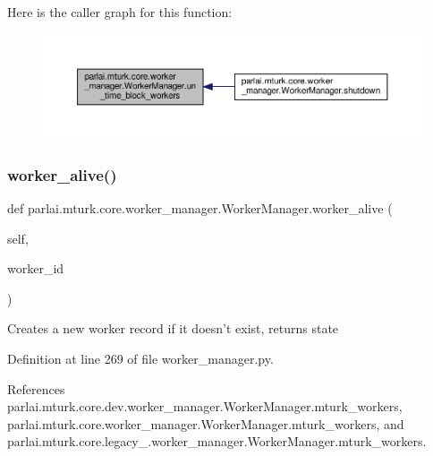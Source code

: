 Here is the caller graph for this function\+:
\nopagebreak
\begin{figure}[H]
\begin{center}
\leavevmode
\includegraphics[width=350pt]{classparlai_1_1mturk_1_1core_1_1worker__manager_1_1WorkerManager_af4c5d947d5477e2b5a7bd6167e125ba9_icgraph}
\end{center}
\end{figure}
\mbox{\label{classparlai_1_1mturk_1_1core_1_1worker__manager_1_1WorkerManager_ae07d1e801e6436a33d2a19f32e41088a}} 
\subsubsection{\texorpdfstring{worker\+\_\+alive()}{worker\_alive()}}
{\footnotesize\ttfamily def parlai.\+mturk.\+core.\+worker\+\_\+manager.\+Worker\+Manager.\+worker\+\_\+alive (\begin{DoxyParamCaption}\item[{}]{self,  }\item[{}]{worker\+\_\+id }\end{DoxyParamCaption})}

\begin{DoxyVerb}Creates a new worker record if it doesn't exist, returns state\end{DoxyVerb}
 

Definition at line 269 of file worker\+\_\+manager.\+py.



References parlai.\+mturk.\+core.\+dev.\+worker\+\_\+manager.\+Worker\+Manager.\+mturk\+\_\+workers, parlai.\+mturk.\+core.\+worker\+\_\+manager.\+Worker\+Manager.\+mturk\+\_\+workers, and parlai.\+mturk.\+core.\+legacy\+\_.\+worker\+\_\+manager.\+Worker\+Manager.\+mturk\+\_\+workers.




